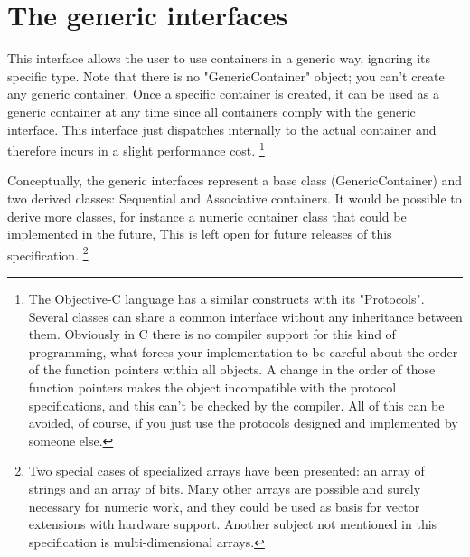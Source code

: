 \documentclass[12pt,a4paper,openany]{memoir} %
\begin{document}
{{\section{The generic interfaces}
This interface allows the user to use containers in a generic way, ignoring its specific type.
Note that there is no "GenericContainer" object; you can't create any generic container. Once a specific container is created, it can be used as a generic container at any time since all containers comply with the generic interface. This interface just dispatches internally to the actual container and therefore incurs in a slight performance cost.
\footnote{
The Objective-C language has a similar constructs with its "Protocols". Several classes can share a common interface without any inheritance between them. Obviously in C there is no compiler support for this kind of programming, what forces your implementation to be careful about the order of the function pointers within all objects. A change in the order of those function pointers makes the object incompatible with the protocol specifications, and this can't be checked by the compiler.
All of this can be avoided, of course, if you just use the protocols designed and implemented by someone else.
}

Conceptually, the generic interfaces represent a base class (GenericContainer) and two derived classes: Sequential and Associative containers.
It would be possible to derive more classes, for instance a numeric container class that could be implemented in the future, This is left open for future releases of this specification.
\footnote{Two special cases of specialized arrays have been presented: an array of strings and an array of bits. Many other arrays are possible and surely necessary for numeric work, and they could be used as basis for vector extensions with hardware support. Another subject not mentioned in this specification  is multi-dimensional arrays.}
}}
\end{document}
